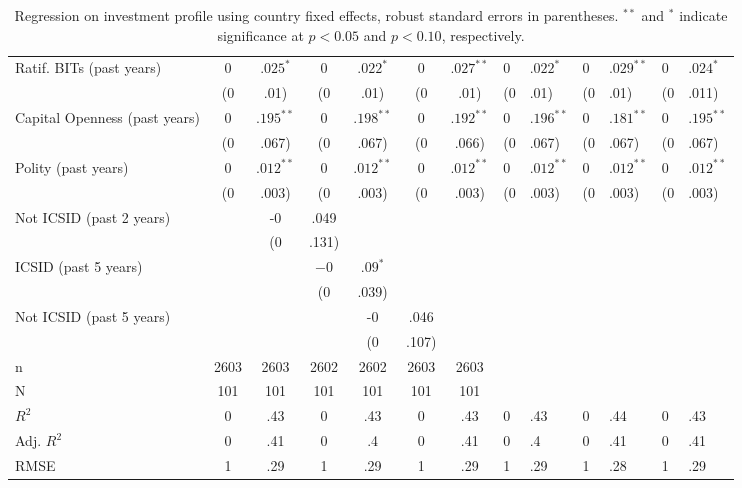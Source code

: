 \begin{table}[ht]
\begin{tabular}{lcccccc}
  Ratif. BITs (past  years) & $0$&$.025^{\ast}$ & $0$&$.022^{\ast}$ & $0$&$.027^{\ast\ast}$ & $0$&$.022^{\ast}$ & $0$&$.029^{\ast\ast}$ & $0$&$.024^{\ast}$ \\ 
   & (0&.01) & (0&.01) & (0&.01) & (0&.01) & (0&.01) & (0&.011) \\ 
  Capital Openness (past  years) & $0$&$.195^{\ast\ast}$ & $0$&$.198^{\ast\ast}$ & $0$&$.192^{\ast\ast}$ & $0$&$.196^{\ast\ast}$ & $0$&$.181^{\ast\ast}$ & $0$&$.195^{\ast\ast}$ \\ 
   & (0&.067) & (0&.067) & (0&.066) & (0&.067) & (0&.067) & (0&.067) \\ 
  Polity (past  years) & $0$&$.012^{\ast\ast}$ & $0$&$.012^{\ast\ast}$ & $0$&$.012^{\ast\ast}$ & $0$&$.012^{\ast\ast}$ & $0$&$.012^{\ast\ast}$ & $0$&$.012^{\ast\ast}$ \\ 
   & (0&.003) & (0&.003) & (0&.003) & (0&.003) & (0&.003) & (0&.003) \\ 
  Not ICSID (past 2 years) &  & -0&.049 &  &  &  &  \\ 
   &  & (0&.131) &  &  &  &  \\ 
  ICSID (past 5 years) &  &  & $-0$&$.09^{\ast}$ &  &  &  \\ 
   &  &  & (0&.039) &  &  &  \\ 
  Not ICSID (past 5 years) &  &  &  & -0&.046 &  &  \\ 
   &  &  &  & (0&.107) &  &  \\ 
   \hline
n & 2603 & 2603 & 2602 & 2602 & 2603 & 2603 \\ 
  N & 101 & 101 & 101 & 101 & 101 & 101 \\ 
  $R^{2}$ & 0&.43 & 0&.43 & 0&.43 & 0&.43 & 0&.44 & 0&.43 \\ 
  Adj. $R^{2}$ & 0&.41 & 0&.4 & 0&.41 & 0&.4 & 0&.41 & 0&.41 \\ 
  RMSE & 1&.29 & 1&.29 & 1&.29 & 1&.29 & 1&.28 & 1&.29 \\ 
   \hline
\hline
\end{tabular}
\endgroup
\caption{Regression on investment profile using country fixed effects, robust standard errors in parentheses. $^{**}$ and $^{*}$ indicate significance at $p< 0.05 $ and $p< 0.10 $, respectively.} 
\end{table}
